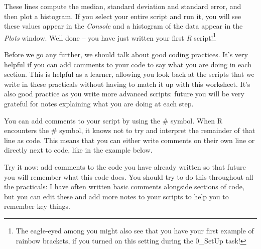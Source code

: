 \documentclass[
  a4paper,
  DIV=11,
  numbers=noendperiod]{scrreprt}
\newenvironment{Shaded}{\begin{snugshade}}{\end{snugshade}}
\newcommand{\CommentTok}[1]{\textcolor[rgb]{0.37,0.37,0.37}{#1}}
\newcommand{\FunctionTok}[1]{\textcolor[rgb]{0.28,0.35,0.67}{#1}}
\newcommand{\NormalTok}[1]{\textcolor[rgb]{0.00,0.23,0.31}{#1}}
\newcommand{\SpecialCharTok}[1]{\textcolor[rgb]{0.37,0.37,0.37}{#1}}
\begin{document}
These lines compute the median, standard deviation and standard error,
and then plot a histogram. If you select your entire script and run it,
you will see these values appear in the \emph{Console} and a histogram
of the data appear in the \emph{Plots} window. Well done -- you have
just written your first \emph{R} script!\footnote{The eagle-eyed among
  you might also see that you have your first example of rainbow
  brackets, if you turned on this setting during the 0\_SetUp task!}

\begin{tcolorbox}[enhanced jigsaw, colbacktitle=quarto-callout-tip-color!10!white, leftrule=.75mm, breakable, colframe=quarto-callout-tip-color-frame, opacityback=0, titlerule=0mm, rightrule=.15mm, opacitybacktitle=0.6, colback=white, coltitle=black, toprule=.15mm, bottomtitle=1mm, bottomrule=.15mm, toptitle=1mm, title=\textcolor{quarto-callout-tip-color}{\faLightbulb}\hspace{0.5em}{Take note! (literally)}, arc=.35mm, left=2mm]

Before we go any further, we should talk about good coding practices.
It's very helpful if you can add comments to your code to say what you
are doing in each section. This is helpful as a learner, allowing you
look back at the scripts that we write in these practicals without
having to match it up with this worksheet. It's also good practice as
you write more advanced scripts: future you will be very grateful for
notes explaining what you are doing at each step.

You can add comments to your script by using the \# symbol. When R
encounters the \# symbol, it knows not to try and interpret the
remainder of that line as code. This means that you can either write
comments on their own line or directly next to code, like in the example
below.

Try it now: add comments to the code you have already written so that
future you will remember what this code does. You should try to do this
throughout all the practicals: I have often written basic comments
alongside sections of code, but you can edit these and add more notes to
your scripts to help you to remember key things.

\end{tcolorbox}

\begin{Shaded}
\end{Shaded}
\end{document}
